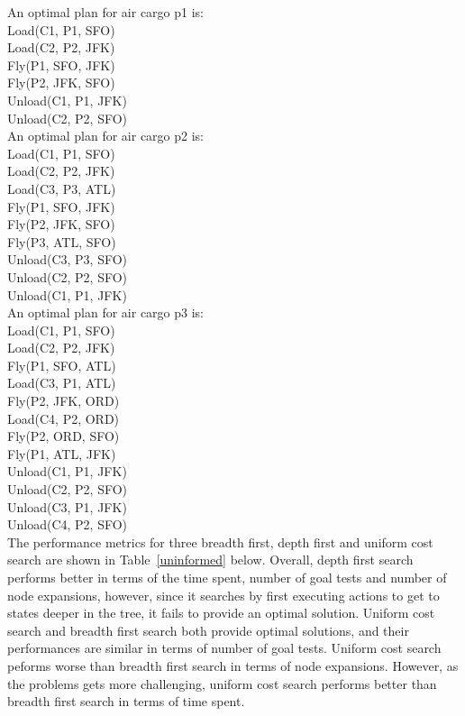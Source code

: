 \documentclass[11pt]{article}
\begin{document}
An optimal plan for air cargo p1 is:\\

Load(C1, P1, SFO)\\
Load(C2, P2, JFK)\\
Fly(P1, SFO, JFK)\\
Fly(P2, JFK, SFO)\\
Unload(C1, P1, JFK)\\
Unload(C2, P2, SFO)\\

An optimal plan for air cargo p2 is:\\

Load(C1, P1, SFO)\\
Load(C2, P2, JFK)\\
Load(C3, P3, ATL)\\
Fly(P1, SFO, JFK)\\
Fly(P2, JFK, SFO)\\
Fly(P3, ATL, SFO)\\
Unload(C3, P3, SFO)\\
Unload(C2, P2, SFO)\\
Unload(C1, P1, JFK)\\

An optimal plan for air cargo p3 is:\\

Load(C1, P1, SFO)\\
Load(C2, P2, JFK)\\
Fly(P1, SFO, ATL)\\
Load(C3, P1, ATL)\\
Fly(P2, JFK, ORD)\\
Load(C4, P2, ORD)\\
Fly(P2, ORD, SFO)\\
Fly(P1, ATL, JFK)\\
Unload(C1, P1, JFK)\\
Unload(C2, P2, SFO)\\
Unload(C3, P1, JFK)\\
Unload(C4, P2, SFO)\\



The performance metrics for three breadth first, depth first and uniform cost search are shown in Table~\ref{uninformed} below.
Overall, depth first search performs better in terms of the time spent, number of goal tests and number of node expansions, however, since 
it searches by first executing actions to get to states deeper in the tree, it fails to provide an optimal solution. Uniform cost search and breadth first search 
both provide optimal solutions, and their performances are similar in terms of number of goal tests. Uniform cost search peforms worse than breadth first search in terms of node expansions.
However, as the problems gets more challenging, uniform cost search performs better than breadth first search in terms of time spent. \\
\end{document}
